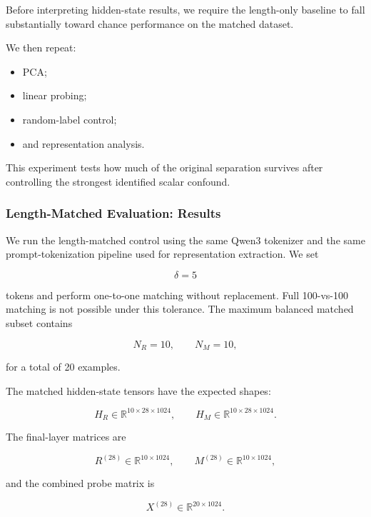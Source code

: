 \documentclass[11pt]{article}
\begin{document}
Before interpreting hidden-state results, we require the length-only
baseline to fall substantially toward chance performance on the
matched dataset.

We then repeat:

\begin{itemize}

    \item PCA;

    \item linear probing;

    \item random-label control;

    \item and representation analysis.

\end{itemize}

This experiment tests how much of the original separation survives
after controlling the strongest identified scalar confound.


\subsubsection{Length-Matched Evaluation: Results}

We run the length-matched control using the same Qwen3 tokenizer and
the same prompt-tokenization pipeline used for representation
extraction. We set

\[
\delta = 5
\]

tokens and perform one-to-one matching without replacement. Full
100-vs-100 matching is not possible under this tolerance. The maximum
balanced matched subset contains

\[
N_R = 10,\qquad N_M = 10,
\]

for a total of 20 examples.

The matched hidden-state tensors have the expected shapes:

\[
H_R \in \mathbb{R}^{10 \times 28 \times 1024},
\qquad
H_M \in \mathbb{R}^{10 \times 28 \times 1024}.
\]

The final-layer matrices are

\[
R^{(28)} \in \mathbb{R}^{10 \times 1024},
\qquad
M^{(28)} \in \mathbb{R}^{10 \times 1024},
\]

and the combined probe matrix is

\[
X^{(28)} \in \mathbb{R}^{20 \times 1024}.
\]
\end{document}
